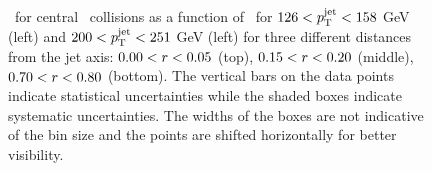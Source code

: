 \begin{figure}
   \caption{\RDptr\ for central \pbpb\ collisions as a function of \pt\ for $126 < \mbox{$p_{\mathrm{T}}^{\mathrm{jet}}$} < 158$ GeV (left) and $200 < \mbox{$p_{\mathrm{T}}^{\mathrm{jet}}$} < 251$ GeV (left) for three different distances from the jet axis: $0.00 < \mbox{$r$} < 0.05$ (top), $0.15 < \mbox{$r$} < 0.20$ (middle), $0.70 < \mbox{$r$} < 0.80$ (bottom). The vertical bars on the data points indicate statistical uncertainties while the shaded boxes indicate systematic uncertainties. The widths of the boxes are not indicative of the bin size and the points are shifted horizontally for better visibility.}
      \label{fig:xrdptr}
\end{figure}




\FloatBarrier
